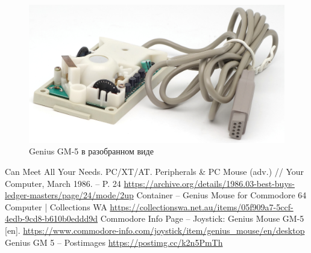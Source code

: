 \documentclass[11pt, a4paper]{article}
\begin{document}
 \begin{figure}[h]
    \centering
    \includegraphics[scale=0.65]{1987_genius_gm5_mouse/inside_30.jpg}
    \caption{Genius GM-5 в разобранном виде}
    \label{fig:GM5MouseInside}
\end{figure}



\begin{thebibliography}{9}
 Can Meet All Your Needs. PC/XT/AT. Peripherals \& PC Mouse (adv.) // Your Computer, March 1986. -- P. 24 \url{https://archive.org/details/1986.03-best-buys-ledger-masters/page/24/mode/2up}
 Container -- Genius Mouse for Commodore 64 Computer | Collections WA \url{https://collectionswa.net.au/items/05f909a7-5ccf-4edb-9cd8-b610b0eddd9d}
 Commodore Info Page -- Joystick: Genius Mouse GM-5 [en]. \url{https://www.commodore-info.com/joystick/item/genius_mouse/en/desktop}
 Genius GM 5 -- Postimages \url{https://postimg.cc/k2n5PmTh}
\end{thebibliography}
\end{document}
